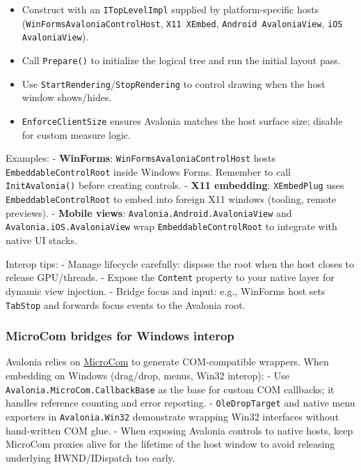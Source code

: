 \begin{itemize}
\tightlist
\item
  Construct with an \passthrough{\lstinline!ITopLevelImpl!} supplied by
  platform-specific hosts
  (\passthrough{\lstinline!WinFormsAvaloniaControlHost!},
  \passthrough{\lstinline!X11 XEmbed!},
  \passthrough{\lstinline!Android AvaloniaView!},
  \passthrough{\lstinline!iOS AvaloniaView!}).
\item
  Call \passthrough{\lstinline!Prepare()!} to initialize the logical
  tree and run the initial layout pass.
\item
  Use
  \passthrough{\lstinline!StartRendering!}/\passthrough{\lstinline!StopRendering!}
  to control drawing when the host window shows/hides.
\item
  \passthrough{\lstinline!EnforceClientSize!} ensures Avalonia matches
  the host surface size; disable for custom measure logic.
\end{itemize}

Examples: - \textbf{WinForms}:
\passthrough{\lstinline!WinFormsAvaloniaControlHost!} hosts
\passthrough{\lstinline!EmbeddableControlRoot!} inside Windows Forms.
Remember to call \passthrough{\lstinline!InitAvalonia()!} before
creating controls. - \textbf{X11 embedding}:
\passthrough{\lstinline!XEmbedPlug!} uses
\passthrough{\lstinline!EmbeddableControlRoot!} to embed into foreign
X11 windows (tooling, remote previews). - \textbf{Mobile views}:
\passthrough{\lstinline!Avalonia.Android.AvaloniaView!} and
\passthrough{\lstinline!Avalonia.iOS.AvaloniaView!} wrap
\passthrough{\lstinline!EmbeddableControlRoot!} to integrate with native
UI stacks.

Interop tips: - Manage lifecycle carefully: dispose the root when the
host closes to release GPU/threads. - Expose the
\passthrough{\lstinline!Content!} property to your native layer for
dynamic view injection. - Bridge focus and input: e.g., WinForms host
sets \passthrough{\lstinline!TabStop!} and forwards focus events to the
Avalonia root.

\subsubsection{MicroCom bridges for Windows
interop}\label{microcom-bridges-for-windows-interop}

Avalonia relies on
\href{https://github.com/AvaloniaUI/MicroCom}{MicroCom} to generate
COM-compatible wrappers. When embedding on Windows (drag/drop, menus,
Win32 interop): - Use
\passthrough{\lstinline!Avalonia.MicroCom.CallbackBase!} as the base for
custom COM callbacks; it handles reference counting and error reporting.
- \passthrough{\lstinline!OleDropTarget!} and native menu exporters in
\passthrough{\lstinline!Avalonia.Win32!} demonstrate wrapping Win32
interfaces without hand-written COM glue. - When exposing Avalonia
controls to native hosts, keep MicroCom proxies alive for the lifetime
of the host window to avoid releasing underlying HWND/IDispatch too
early.

